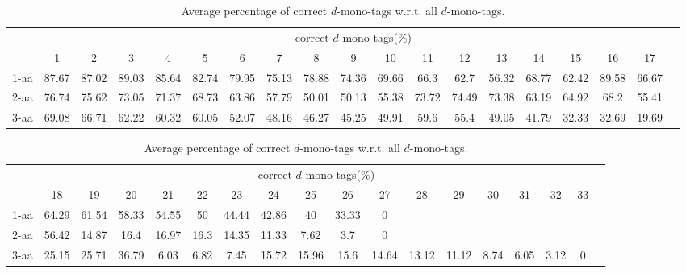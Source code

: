 \begin{table}[h]\tiny
\vspace{3mm}
{\centering
\begin{center}
\begin{tabular}{|l|c|c|c|c|c|c|c|c|c|c|c|c|c|c|c|c|c|c|}
  \hline
  & \multicolumn{ 17 }{|c|}{correct $d$-mono-tags(\%)} \\
  \cline{2- 18}
    & 1 & 2 & 3 & 4 & 5 & 6 & 7 & 8 & 9 & 10 & 11 & 12 & 13 & 14 & 15 & 16 & 17\\
  \hline
1-aa  & 87.67 & 87.02 & 89.03 & 85.64 & 82.74 & 79.95 & 75.13 & 78.88 & 74.36 & 69.66 & 66.3 & 62.7 & 56.32 & 68.77 & 62.42 & 89.58 & 66.67\\
2-aa  & 76.74 & 75.62 & 73.05 & 71.37 & 68.73 & 63.86 & 57.79 & 50.01 & 50.13 & 55.38 & 73.72 & 74.49 & 73.38 & 63.19 & 64.92 & 68.2 & 55.41\\
3-aa  & 69.08 & 66.71 & 62.22 & 60.32 & 60.05 & 52.07 & 48.16 & 46.27 & 45.25 & 49.91 & 59.6 & 55.4 & 49.05 & 41.79 & 32.33 & 32.69 & 19.69\\
 \hline
\end{tabular}
\end{center}
\par}
\centering
\caption{ Average percentage of correct $d$-mono-tags w.r.t. all $d$-mono-tags.}
\vspace{3mm}
\label{table:correct-d-mono-tags}
\end{table}
\begin{table}[h]\tiny
\vspace{3mm}
{\centering
\begin{center}
\begin{tabular}{|l|c|c|c|c|c|c|c|c|c|c|c|c|c|c|c|c|c|}
  \hline
  & \multicolumn{ 16 }{|c|}{correct $d$-mono-tags(\%)} \\
  \cline{2- 17}
    & 18 & 19 & 20 & 21 & 22 & 23 & 24 & 25 & 26 & 27 & 28 & 29 & 30 & 31 & 32 & 33\\
  \hline
1-aa  & 64.29 & 61.54 & 58.33 & 54.55 & 50 & 44.44 & 42.86 & 40 & 33.33 & 0 &  &  &  &  &  & \\
2-aa  & 56.42 & 14.87 & 16.4 & 16.97 & 16.3 & 14.35 & 11.33 & 7.62 & 3.7 & 0 &  &  &  &  &  & \\
3-aa  & 25.15 & 25.71 & 36.79 & 6.03 & 6.82 & 7.45 & 15.72 & 15.96 & 15.6 & 14.64 & 13.12 & 11.12 & 8.74 & 6.05 & 3.12 & 0\\
 \hline
\end{tabular}
\end{center}
\par}
\centering
\caption{ Average percentage of correct $d$-mono-tags w.r.t. all $d$-mono-tags.}
\vspace{3mm}
\label{table:correct-d-mono-tags}
\end{table}
